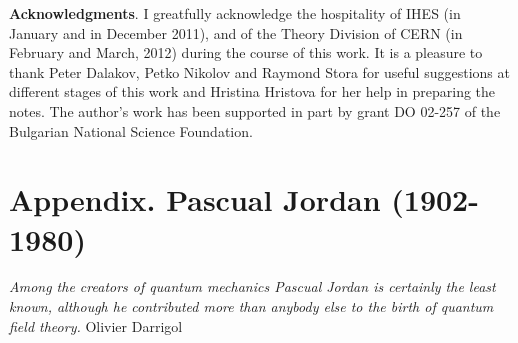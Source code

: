 \documentclass[12pt]{article}
\begin{document}
{\bf Acknowledgments}. I greatfully acknowledge the hospitality of IHES (in January and in December 2011), and of the Theory Division of CERN (in February and March, 2012) during the course of this work. It is a pleasure to thank Peter Dalakov, Petko Nikolov and Raymond Stora for useful suggestions at different stages of this work and Hristina Hristova for her help in preparing the notes. The author's work has been supported in part by grant DO 02-257 of the Bulgarian National Science Foundation.
\newpage

\section*{Appendix. Pascual Jordan (1902-1980)}

\hfill\begin{minipage}{.7\linewidth}
{\it Among the creators of quantum mechanics Pascual Jordan is certainly the least known, although
he contributed more than anybody else to the birth of quantum field theory.}
Olivier Darrigol \cite{Dar}
\end{minipage}

\bigskip
\end{document}
